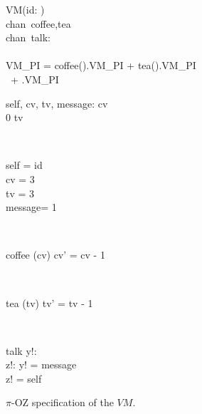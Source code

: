 \begin{figure}[H]
\centering
\begin{class}{VM(id: \integer)}
\ 
\\chan\ coffee,tea
\ 
\\chan\ talk:\integer \times \integer
\ \\ \
\\VM\_PI = coffee().VM\_PI + tea().VM\_PI 
\\ \ \qquad \qquad + .VM\_PI
\\
\begin{state}
self, cv, tv, message: \integer
{} \leq  cv 
\\
0 \leq  tv 
\end{state} 
\\
\begin{init}
self = id
\\cv = 3
\\tv = 3
\\ message= 1
\end{init} 
\\
\begin{op}{coffee}
\Delta (cv)
\ST
cv' = cv - 1
\end{op}
\\
\begin{op}{tea}
\Delta (tv)
\ST
tv' = tv - 1
\end{op}
\\
\begin{op}{talk}
y!: \integer
\\z!: \integer
\ST
y! = message
\\z! = self
\end{op}
\end{class}
\caption{$\pi$-OZ specification of the $VM$.}
\label{comp_oz_pi_statefull_vm}
\end{figure}